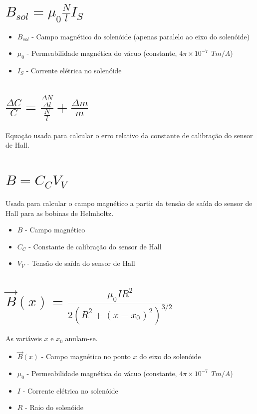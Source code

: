 \documentclass{report}
\begin{document}
\section*{$B_{sol} = \mu_0 \frac{N}{l} I_S$}
\begin{itemize}
    \item $B_{sol}$ - Campo magnético do solenóide (apenas paralelo ao eixo do solenóide)
    \item $\mu_0$ - Permeabilidade magnética do vácuo (constante, $4\pi \times 10^{-7}~~Tm/A$)
    \item $I_S$ - Corrente elétrica no solenóide
\end{itemize}

\section*{$\frac{\Delta C}{C} = \frac{\frac{\Delta N}{\Delta l}}{\frac{N}{l}} + \frac{\Delta m}{m}$}
Equação usada para calcular o erro relativo da constante de calibração do sensor de Hall.

\section*{$B = C_CV_V$}
Usada para calcular o campo magnético a partir da tensão de saída do sensor de Hall para as bobinas de Helmholtz.
\begin{itemize}
    \item $B$ - Campo magnético
    \item $C_C$ - Constante de calibração do sensor de Hall
    \item $V_V$ - Tensão de saída do sensor de Hall
\end{itemize}

\section*{$\vec{B}(x) = \frac{\mu_0 I R^2}{2(R^2 + (x - x_0)^2)^{3/2}}$}
As variáveis $x$ e $x_0$ anulam-se.
\begin{itemize}
    \item $\vec{B}(x)$ - Campo magnético no ponto $x$ do eixo do solenóide
    \item $\mu_0$ - Permeabilidade magnética do vácuo (constante, $4\pi \times 10^{-7}~~Tm/A$)
    \item $I$ - Corrente elétrica no solenóide
    \item $R$ - Raio do solenóide
\end{itemize}
\end{document}
